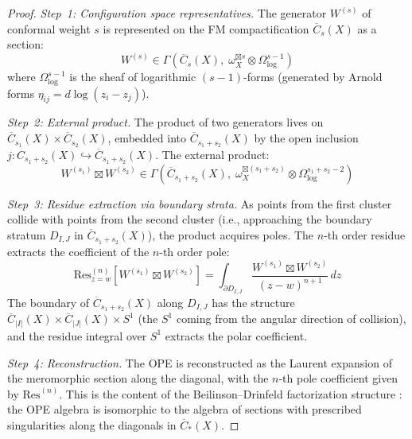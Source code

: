 \begin{proof}
\emph{Step~1: Configuration space representatives.}
The generator $W^{(s)}$ of conformal weight $s$ is represented on the FM compactification $\overline{C}_{s}(X)$ as a section:
\[
W^{(s)} \in \Gamma\!\left(\overline{C}_{s}(X),\; \omega_X^{\boxtimes s} \otimes \Omega^{s-1}_{\log}\right)
\]
where $\Omega^{s-1}_{\log}$ is the sheaf of logarithmic $(s{-}1)$-forms (generated by Arnold forms $\eta_{ij} = d\log(z_i - z_j)$).

\emph{Step~2: External product.}
The product of two generators lives on $\overline{C}_{s_1}(X) \times \overline{C}_{s_2}(X)$, embedded into $\overline{C}_{s_1+s_2}(X)$ by the open inclusion $j\colon C_{s_1+s_2}(X) \hookrightarrow \overline{C}_{s_1+s_2}(X)$.  The external product:
\[
W^{(s_1)} \boxtimes W^{(s_2)} \in \Gamma\!\left(\overline{C}_{s_1+s_2}(X),\; \omega_X^{\boxtimes(s_1+s_2)} \otimes \Omega^{s_1+s_2-2}_{\log}\right)
\]

\emph{Step~3: Residue extraction via boundary strata.}
As points from the first cluster collide with points from the second cluster (i.e., approaching the boundary stratum $D_{I,J}$ in $\overline{C}_{s_1+s_2}(X)$), the product acquires poles.  The $n$-th order residue extracts the coefficient of the $n$-th order pole:
\[
\mathrm{Res}^{(n)}_{z=w}\!\left[W^{(s_1)} \boxtimes W^{(s_2)}\right] = \int_{\partial D_{I,J}} \frac{W^{(s_1)} \boxtimes W^{(s_2)}}{(z-w)^{n+1}} \, dz
\]
The boundary of $\overline{C}_{s_1+s_2}(X)$ along $D_{I,J}$ has the structure $\overline{C}_{|I|}(X) \times \overline{C}_{|J|}(X) \times S^1$ (the $S^1$ coming from the angular direction of collision), and the residue integral over $S^1$ extracts the polar coefficient.

\emph{Step~4: Reconstruction.}
The OPE is reconstructed as the Laurent expansion of the meromorphic section along the diagonal, with the $n$-th pole coefficient given by $\mathrm{Res}^{(n)}$.  This is the content of the Beilinson--Drinfeld factorization structure \cite{BD04}: the OPE algebra is isomorphic to the algebra of sections with prescribed singularities along the diagonals in $\overline{C}_*(X)$.
\end{proof}

